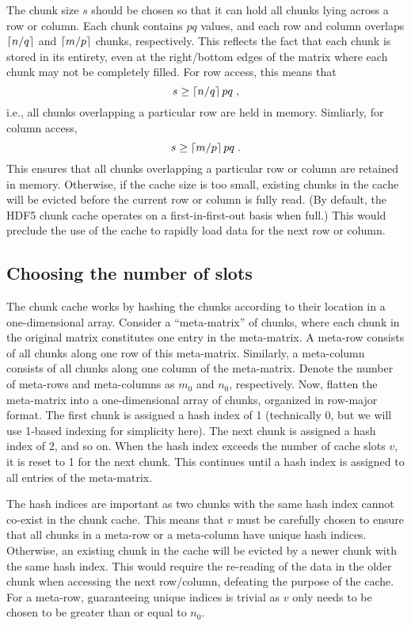 \documentclass{article}
\begin{document}
The chunk size $s$ should be chosen so that it can hold all chunks lying across a row or column.
Each chunk contains $pq$ values, and each row and column overlaps $\left \lceil n/q \right \rceil$ and $\left \lceil m/p \right \rceil$ chunks, respectively.
This reflects the fact that each chunk is stored in its entirety, even at the right/bottom edges of the matrix where each chunk may not be completely filled.
For row access, this means that 
\begin{equation}
s \ge \left \lceil n/q \right \rceil pq \;, 
\end{equation}
i.e., all chunks overlapping a particular row are held in memory. Simliarly, for column access, 
\begin{equation}
s \ge \left \lceil m/p \right \rceil pq \;.
\end{equation}
This ensures that all chunks overlapping a particular row or column are retained in memory.
Otherwise, if the cache size is too small, existing chunks in the cache will be evicted before the current row or column is fully read.
(By default, the HDF5 chunk cache operates on a first-in-first-out basis when full.)
This would preclude the use of the cache to rapidly load data for the next row or column.

\subsection{Choosing the number of slots}
\label{sec:slotchoice}
The chunk cache works by hashing the chunks according to their location in a one-dimensional array.
Consider a ``meta-matrix'' of chunks, where each chunk in the original matrix constitutes one entry in the meta-matrix.
A meta-row consists of all chunks along one row of this meta-matrix.
Similarly, a meta-column consists of all chunks along one column of the meta-matrix. 
Denote the number of meta-rows and meta-columns as $m_0$ and $n_0$, respectively.
Now, flatten the meta-matrix into a one-dimensional array of chunks, organized in row-major format.
The first chunk is assigned a hash index of 1 (technically 0, but we will use 1-based indexing for simplicity here).
The next chunk is assigned a hash index of 2, and so on.
When the hash index exceeds the number of cache slots $v$, it is reset to 1 for the next chunk.
This continues until a hash index is assigned to all entries of the meta-matrix.

The hash indices are important as two chunks with the same hash index cannot co-exist in the chunk cache.
This means that $v$ must be carefully chosen to ensure that all chunks in a meta-row or a meta-column have unique hash indices.
Otherwise, an existing chunk in the cache will be evicted by a newer chunk with the same hash index.
This would require the re-reading of the data in the older chunk when accessing the next row/column, defeating the purpose of the cache.
For a meta-row, guaranteeing unique indices is trivial as $v$ only needs to be chosen to be greater than or equal to $n_0$.
\end{document}
